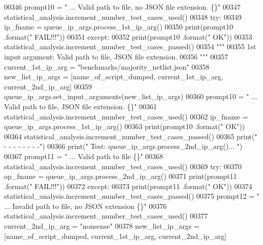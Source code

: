\begin{DoxyCode}
00346         prompt10 = \textcolor{stringliteral}{"    ... Valid path to file, no JSON file extension. \{\}"}
00347         statistical\_analysis.increment\_number\_test\_cases\_used()
00348         \textcolor{keywordflow}{try}:
00349             ip\_fname = queue\_ip\_args.process\_1st\_ip\_arg()
00350             print(prompt10 .format(\textcolor{stringliteral}{"        FAIL!!!"}))
00351         \textcolor{keywordflow}{except}:
00352             print(prompt10 .format(\textcolor{stringliteral}{"    OK"}))
00353             statistical\_analysis.increment\_number\_test\_cases\_passed()
00354         \textcolor{stringliteral}{"""}
00355 \textcolor{stringliteral}{            1st input argument: Valid path to file, JSON file extension.}
00356 \textcolor{stringliteral}{        """}
00357         current\_1st\_ip\_arg = \textcolor{stringliteral}{"benchmarks/majority\_netlist.json"}
00358         new\_list\_ip\_args = [name\_of\_script\_dumped, current\_1st\_ip\_arg, current\_2nd\_ip\_arg]
00359         queue\_ip\_args.set\_input\_arguments(new\_list\_ip\_args)
00360         prompt10 = \textcolor{stringliteral}{"    ... Valid path to file, JSON file extension.    \{\}"}
00361         statistical\_analysis.increment\_number\_test\_cases\_used()
00362         ip\_fname = queue\_ip\_args.process\_1st\_ip\_arg()
00363         print(prompt10 .format(\textcolor{stringliteral}{"    OK"}))
00364         statistical\_analysis.increment\_number\_test\_cases\_passed()
00365         print(\textcolor{stringliteral}{" -   -   -   -   -   -   -   -"})
00366         print(\textcolor{stringliteral}{" Test: queue\_ip\_args.process\_2nd\_ip\_arg()... "})
00367         prompt11 = \textcolor{stringliteral}{"    ... Valid path to file  \{\}"}
00368         statistical\_analysis.increment\_number\_test\_cases\_used()
00369         \textcolor{keywordflow}{try}:
00370             op\_fname = queue\_ip\_args.process\_2nd\_ip\_arg()
00371             print(prompt11 .format(\textcolor{stringliteral}{"                FAIL!!!"}))
00372         \textcolor{keywordflow}{except}:
00373             print(prompt11 .format(\textcolor{stringliteral}{"                OK"}))
00374             statistical\_analysis.increment\_number\_test\_cases\_passed()
00375         prompt12 = \textcolor{stringliteral}{"    ... Invalid path to file, no JSON extension \{\}"}
00376         statistical\_analysis.increment\_number\_test\_cases\_used()
00377         current\_2nd\_ip\_arg = \textcolor{stringliteral}{"nonsense"}
00378         new\_list\_ip\_args = [name\_of\_script\_dumped, current\_1st\_ip\_arg, current\_2nd\_ip\_arg]

\end{DoxyCode}

